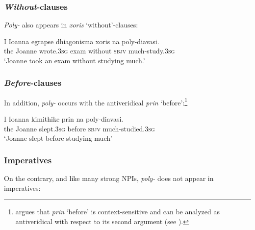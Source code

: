 \documentclass[output=paper]{langscibook}
\begin{document}
\subsubsection{\textit{Without}-clauses}

\noindent \textit{Poly-} also appears in \textit{xoris} `without'-clauses:

\begin{exe}
        \ex\label{gia:ex9} \gll I Ioanna egrapse dhiagonisma xoris na poly-diavasi. \\
        the Joanne wrote.\textsc{3sg} exam without \textsc{sbjv} much-study.\textsc{3sg} \\
        \trans `Joanne took an exam without studying much.'
\end{exe}

\subsubsection{\textit{Before}-clauses}

\noindent In addition, \textit{poly-} occurs with the antiveridical \textit{prin} `before':\footnote{\citet{giannaki1997dissert,giannaki1998} argues that \textit{prin} `before’ is context-sensitive and can be analyzed as antiveridical with respect to its second argument (see \citealt[143]{giannaki1998}).}

\begin{exe}
        \ex\label{gia:ex10} \gll I Ioanna kimithike prin na poly-diavasi. \\
        the Joanne slept.\textsc{3sg} before \textsc{sbjv} much-studied.\textsc{3sg} \\
        \trans `Joanne slept before studying much'
\end{exe}

\subsubsection{Imperatives}

\noindent On the contrary, and like many strong NPIs, \textit{poly-} does not appear in imperatives:

\begin{exe}
        \label{gia:ex11}
\end{exe}
\end{document}
